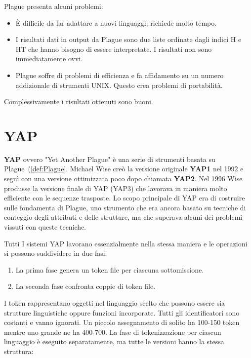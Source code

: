 		Plague presenta alcuni problemi: 
		
		\begin{itemize}
			\item È difficile da far adattare a nuovi linguaggi; richiede molto tempo. 
			\item I risultati dati in output da Plague sono due liste ordinate dagli indici H e HT che hanno bisogno di essere interpretate. I risultati non sono immediatamente ovvi.
			\item Plague soffre di problemi di efficienza e fa affidamento su un numero addizionale di strumenti UNIX. Questo crea problemi di portabilità.
		\end{itemize}
		Complessivamente i risultati ottenuti sono buoni.
		
	\section{YAP}
		\textbf{YAP} ovvero "Yet Another Plague" è una serie di strumenti basata su Plague~(\ref{def:Plague}.
		Michael Wise creò la versione originale \textbf{YAP1} nel 1992 e seguì con una versione ottimizzata poco dopo chiamata \textbf{YAP2}. 
		Nel 1996 Wise produsse la versione finale di YAP (YAP3) che lavorava in maniera molto efficiente con le sequenze trasposte. 
		Lo scopo principale di YAP era di costruire sulle fondamenta di Plague, uno strumento che era ancora basato su tecniche di conteggio degli attributi e delle strutture, ma che superava alcuni dei problemi vissuti con queste tecniche. 
		
		Tutti I sistemi YAP lavorano essenzialmente nella stessa maniera e le operazioni si possono suddividere in due fasi:
		\begin{enumerate}
			\item La prima fase genera un token file per ciascuna sottomissione.
			\item La seconda fase confronta coppie di token file.
		\end{enumerate}
		
		I token rappresentano oggetti nel linguaggio scelto che possono essere sia strutture linguistiche oppure funzioni incorporate.
		Tutti gli identificatori sono costanti e vanno ignorati. 
		Un piccolo assegnamento di solito ha 100-150 token mentre uno grande ne ha 400-700. 
		La fase di tokenizzazione per ciascun linguaggio è eseguito separatamente, ma tutte le versioni hanno la stessa struttura: 
		
